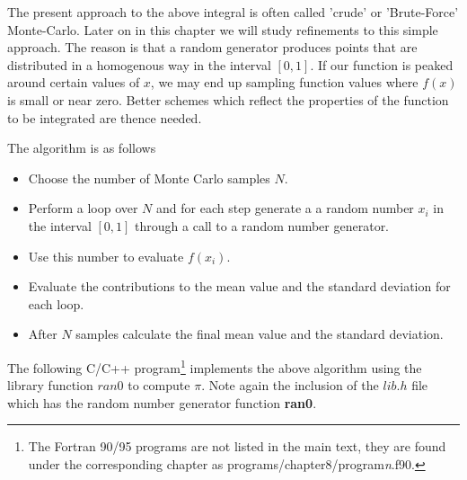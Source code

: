The present  approach to the above integral is often called 'crude' or 
'Brute-Force' Monte-Carlo. 
Later on in this chapter we will study refinements to this
simple approach. The reason is that a random generator 
produces 
points that are distributed
in a homogenous way in the interval $[0,1]$.  
If our function is peaked around certain values of $x$,  
we may end 
up sampling function values where 
$f(x)$ is small or near zero. Better schemes which reflect the 
properties of the function to be integrated are thence needed.

The algorithm is as follows
\begin{svgraybox}
\begin{itemize}
   \item Choose the number of Monte Carlo samples $N$. 
   \item Perform a loop over $N$ and for each step generate a 
         a random number $x_i$ in the interval $[0,1]$ through a call
         to a random number generator.
   \item Use this number to evaluate $f(x_i)$.
   \item Evaluate the contributions to the mean value and the standard
         deviation for each loop.
   \item After $N$ samples calculate the final mean value and the standard
         deviation. 
\end{itemize}
\end{svgraybox}
The following C/C++ program\footnote{The Fortran 90/95 programs are not listed in the main text, 
they are found under the corresponding chapter as programs/chapter8/program{\it n}.f90.} 
implements the above algorithm using the library function $ran0$ to compute $\pi$. 
Note again the inclusion of the $lib.h$ file which has the random number generator function {\bf ran0}.
\lstset{language=c++}
